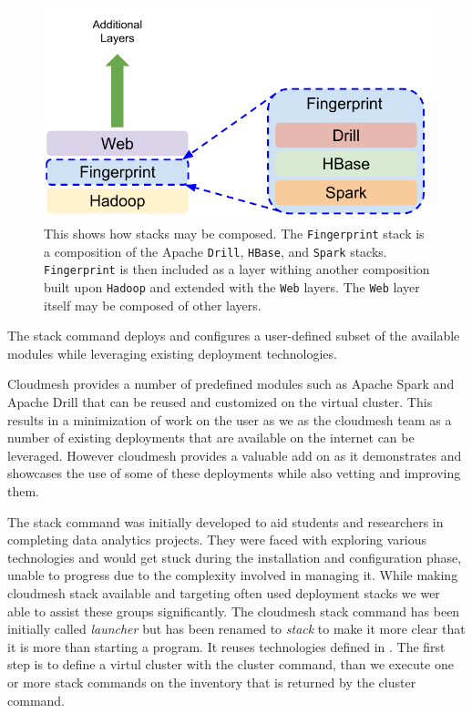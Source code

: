 \begin{figure}
\centering
\includegraphics[width=1\columnwidth]{images/cloudmesh-stack-composition.pdf}
\caption{This shows how stacks may be composed. The
  \texttt{Fingerprint} stack is a composition of the Apache
  \texttt{Drill}, \texttt{HBase}, and \texttt{Spark}
  stacks. \texttt{Fingerprint} is then included as a layer withing
  another composition built upon \texttt{Hadoop} and extended with the
  \texttt{Web} layers. The \texttt{Web} layer itself may be composed
  of other layers.
  \label{F:stack-composition}}
\end{figure}


The stack command deploys and configures a user-defined subset of the
available modules while leveraging existing deployment technologies.

Cloudmesh provides a number of predefined modules such as Apache Spark
and Apache Drill that can be reused and customized on the virtual
cluster. This results in a minimization of work on the user as we as
the cloudmesh team as a number of existing deployments that are
available on the internet can be leveraged. However cloudmesh provides
a valuable add on as it demonstrates and showcases the use of some of
these deployments while also vetting and improving them.


The stack command was initially developed to aid students and
researchers in completing data analytics projects.  They were faced
with exploring various technologies and would get stuck during the
installation and configuration phase, unable to progress due to the
complexity involved in managing it. While making cloudmesh stack
available and targeting often used deployment stacks we wer able to
assist these groups significantly.  The cloudmesh stack command has
been initially called {\em launcher} but has been renamed to {\em
  stack} to make it more clear that it is more than starting a
program. It reuses technologies defined in . The first step is
to define a virtul cluster with the cluster command, than we execute
one or more stack commands on the inventory that is returned by the
cluster command.

